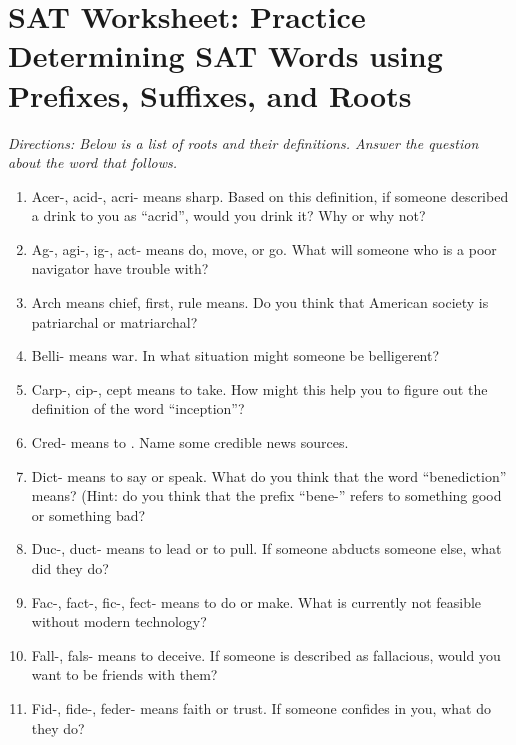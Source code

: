 \section{\sloppy SAT Worksheet: Practice Determining SAT Words using Prefixes, Suffixes, and Roots}

\textit{Directions: Below is a list of roots and their definitions. Answer the question about the word that follows.}

\begin{enumerate}
\item Acer-, acid-, acri- means sharp. Based on this definition, if someone described a drink to you as ``acrid'', would you drink it? Why or why not? \hrulefill

\item Ag-, agi-, ig-, act- means do, move, or go. What will someone who is a poor navigator have trouble with? \hrulefill

\item Arch means chief, first, rule means. Do you think that American society is patriarchal or matriarchal? \hrulefill

\item Belli- means war. In what situation might someone be belligerent? \hrulefill

\item Carp-, cip-, cept means to take. How might this help you to figure out the definition of the word ``inception''? \hrulefill

\item Cred- means to \hrulefill. Name some credible news sources. \hrulefill

\item Dict- means to say or speak. What do you think that the word ``benediction'' means? \hrulefill (Hint: do you think that the prefix ``bene-'' refers to something good or something bad? \hrulefill

\item Duc-, duct- means to lead or to pull. If someone abducts someone else, what did they do? \hrulefill

\item Fac-, fact-, fic-, fect- means to do or make. What is currently not feasible without modern technology? \hrulefill

\item Fall-, fals- means to deceive. If someone is described as fallacious, would you want to be friends with them? \hrulefill

\item Fid-, fide-, feder- means faith or trust. If someone confides in you, what do they do? \hrulefill


\end{enumerate}
